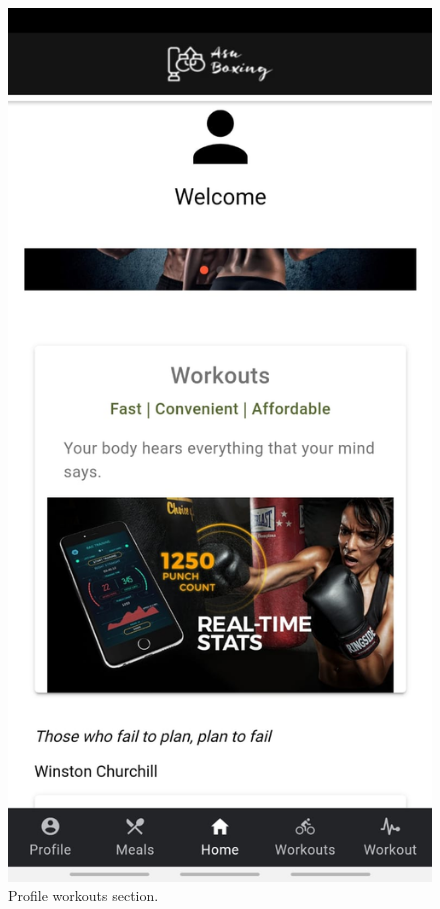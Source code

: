 \documentclass[a4paper,12pt]{report}
\begin{document}
\begin{figure}[ht]
\begin{minipage}[b]{0.5\linewidth}
    \includegraphics[width=.7\linewidth]{images/aplicationImages/homePageTop.jpeg} 
    \caption{Profile workouts section.} 
    \vspace{4ex}
  \end{minipage} 

\end{figure}
\end{document}
